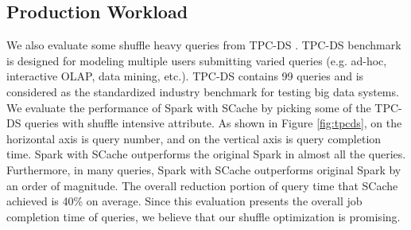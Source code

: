 \subsection{Production Workload}
We also evaluate some shuffle heavy queries from TPC-DS \cite{tpcds}. TPC-DS benchmark is designed for modeling multiple users submitting varied queries (e.g. ad-hoc, interactive OLAP, data mining, etc.). TPC-DS contains 99 queries and is considered as the standardized industry benchmark for testing big data systems. We evaluate the performance of Spark with SCache by picking some of the TPC-DS queries with shuffle intensive attribute. As shown in Figure \ref{fig:tpcds}, on the horizontal axis is query number, and on the vertical axis is query completion time. Spark with SCache outperforms the original Spark in almost all the queries. Furthermore, in many queries, Spark with SCache outperforms original Spark by an order of magnitude. The overall reduction portion of query time that SCache achieved is 40\% on average. Since this evaluation presents the overall job completion time of queries, we believe that our shuffle optimization is promising.
